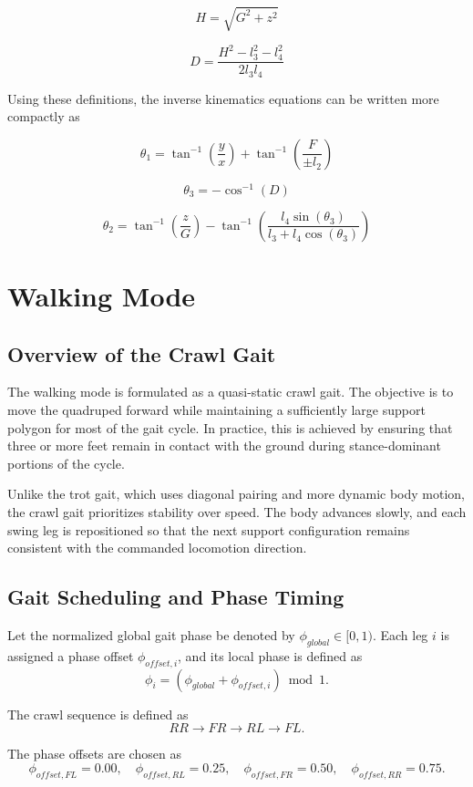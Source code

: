 \documentclass[11pt,a4paper]{report}
\begin{document}
\[
H
=
\sqrt{G^2+z^2}
\]

\[
D
=
\frac
{H^2-l_3^2-l_4^2}
{2l_3l_4}
\]

Using these definitions, the inverse kinematics equations can be written
more compactly as

\[
\theta_1
=
\tan^{-1}\!\left(\frac{y}{x}\right)
+
\tan^{-1}\!\left(\frac{F}{\pm l_2}\right)
\]

\[
\theta_3
=
-\cos^{-1}(D)
\]

\[
\theta_2
=
\tan^{-1}\!\left(\frac{z}{G}\right)
-
\tan^{-1}
\!\left(
\frac
{l_4\sin(\theta_3)}
{l_3+l_4\cos(\theta_3)}
\right)
\]
\chapter{Walking Mode}

\section{Overview of the Crawl Gait}

The walking mode is formulated as a quasi-static crawl gait. The objective is to move the quadruped forward while maintaining a sufficiently large support polygon for most of the gait cycle. In practice, this is achieved by ensuring that three or more feet remain in contact with the ground during stance-dominant portions of the cycle.

Unlike the trot gait, which uses diagonal pairing and more dynamic body motion, the crawl gait prioritizes stability over speed. The body advances slowly, and each swing leg is repositioned so that the next support configuration remains consistent with the commanded locomotion direction.

\section{Gait Scheduling and Phase Timing}

Let the normalized global gait phase be denoted by \(\phi_{global} \in [0,1)\). Each leg \(i\) is assigned a phase offset \(\phi_{offset,i}\), and its local phase is defined as
\[
\phi_i = (\phi_{global} + \phi_{offset,i}) \bmod 1.
\]

The crawl sequence is defined as
\[
RR \rightarrow FR \rightarrow RL \rightarrow FL.
\]

The phase offsets are chosen as
\[
\phi_{offset,FL}=0.00,\quad
\phi_{offset,RL}=0.25,\quad
\phi_{offset,FR}=0.50,\quad
\phi_{offset,RR}=0.75.
\]
\end{document}
